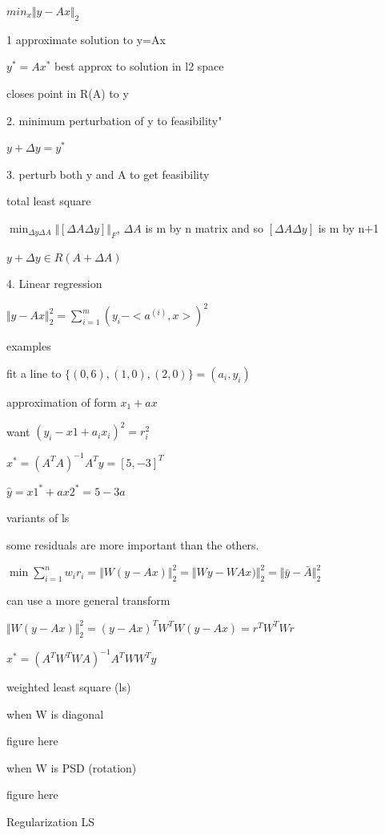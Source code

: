 $min_x \Vert y-Ax\Vert_2$

1 approximate solution to y=Ax

$y^*=Ax^*$ best approx to solution in l2 space

closes point in R(A) to y

2. minimum perturbation of y to feasibility"

$y+\Delta y= y^*$

3. perturb both y and A to get feasibility

total least square

$\min_{\Delta y \Delta A} \Vert [\Delta A \Delta y] \Vert_F$, $\Delta A$ is m by n matrix and so $[\Delta A \Delta y]$ is m by n+1



$y+\Delta y\in R(A+\Delta A)$


4. Linear regression

$\Vert y-Ax\Vert ^2_2 = \sum_{i=1}^{m} ( y_i - <a^{(i)} , x>)^2$


examples

fit a line to $\{(0,6),(1,0),(2,0) \}={(a_i,y_i)}$

approximation of form $x_1+ax$

want $(y_i-x1+a_ix_i)^2 = r_i^2$

$x^*=(A^TA)^{-1}A^Ty=[5 , -3]^T$


$\hat{y}=x1^*+ax2^*=5-3a$            %


variants of ls

some residuals are more important than the others.

$\min \sum_{i=1}^{n} w_i r_i=\Vert W (y-Ax)\Vert ^2_2=\Vert Wy-WAx)\Vert ^2_2=\Vert \bar{y}-\bar{A} \Vert ^2_2$

can use a more general transform 

$\Vert W (y-Ax)\Vert ^2_2 = (y-Ax)^TW^TW(y-Ax)=r^TW^TWr$

$x^*=(A^TW^TWA)^{-1}A^TWW^Ty$




weighted least square (ls) 

when W is diagonal 

figure here

when W is PSD (rotation)

figure here




Regularization LS

